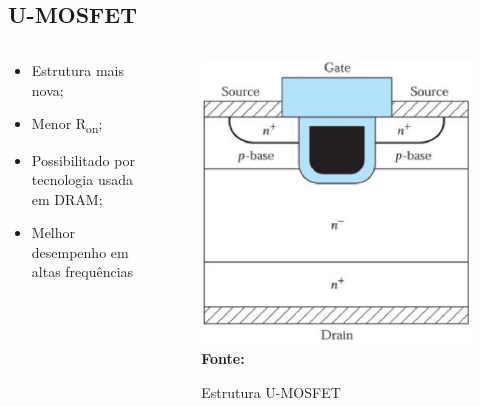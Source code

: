 \begin{frame}
\begin{columns}[t]
\begin{column}{7cm}
        \end{column}

    \end{columns}

\end{frame}


\subsection{U-MOSFET}

\begin{frame}

    \begin{columns}[t]
    
        \begin{column}{7cm}

            \begin{itemize}
                \item Estrutura mais nova;
                \item Menor R\textsubscript{on};
                \item Possibilitado por tecnologia usada em DRAM;
                \item Melhor desempenho em altas frequências
            \end{itemize}

        \end{column}

        \begin{column}{7cm}

            \begin{figure}[!htbp]
                \centering
                \caption{Estrutura U-MOSFET}
                \includegraphics[scale=0.2]{imagens/umosfet.png}
                \\\small{\textbf{Fonte:} \cite{sze2012semiconductor}}%
            \end{figure}


\end{column}
\end{columns}
\end{frame}
